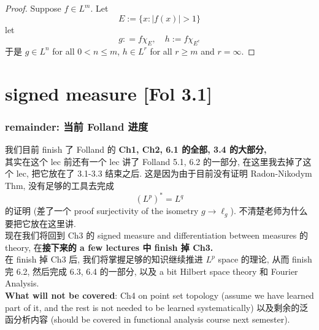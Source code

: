 \documentclass[lang=cn,11pt]{elegantbook}
\begin{document}
\begin{proof}
Suppose $f \in L^m$. Let \[
E:= \{ x:|f(x)|>1\} 
\]
let \[
g: = f\chi_E,\quad h := f \chi_{E^c}
\]
于是 $g \in L^n$ for all $0< n \leq m$, $h \in L^r$ for all $r \geq m$ and $r= \infty$.
\end{proof}







\chapter{signed measure [Fol 3.1]}
\subsection{remainder: 当前 Folland 进度}
我们目前 finish 了 Folland 的\textbf{ Ch1, Ch2, 6.1 的全部, 3.4 的大部分, }\\
其实在这个 lec 前还有一个 lec 讲了 Folland 5.1, 6.2 的一部分, 在这里我去掉了这个 lec, 把它放在了 3.1-3.3 结束之后.  这是因为由于目前没有证明 Radon-Nikodym Thm, 没有足够的工具去完成 \[
(L^p)^* = L^q
\]
的证明 (差了一个 proof surjectivity of the isometry $g \to \ell_g$). 不清楚老师为什么要把它放在这里讲.\\
现在我们将回到 Ch3 的 signed measure and differentiation between measures 的 theory, 在\textbf{接下来的 a few lectures 中 finish 掉 Ch3.}\\
在 finish 掉 Ch3 后, 我们将掌握足够的知识继续推进 $L^p$ space 的理论, 从而 finish 完 6.2, 然后完成 6.3, 6.4 的一部分, 以及 a bit Hilbert space theory 和 Fourier Analysis.\\
\textbf{What will not be covered}: Ch4 on point set topology (assume we have learned part of it, and the rest is not needed to be learned systematically) 以及剩余的泛函分析内容 (should be covered in functional analysis course next semester).
\end{document}
